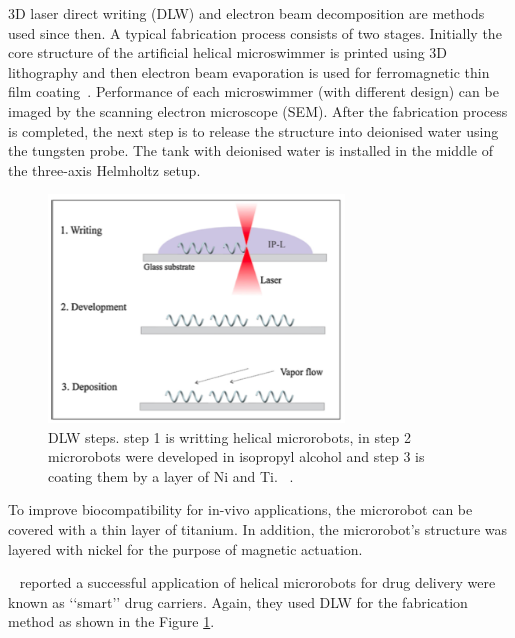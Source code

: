 \documentclass[12pt,a4paper,titlepage]{report}
\begin{document}
3D laser direct writing (DLW) and electron beam decomposition are methods used since then. A typical 
fabrication process consists of two stages. Initially the core structure of the artificial helical 
microswimmer is printed using 3D lithography and then electron beam evaporation is used for 
ferromagnetic thin film coating~\citep{tottori2013artificial}.  
Performance of each microswimmer (with different design) can be imaged by the scanning electron
 microscope (SEM). After the fabrication process is completed, the next step is to release the structure into 
deionised water using the tungsten probe. The tank with deionised water is installed in the middle of the 
three-axis Helmholtz setup. 




\begin{figure}
  \centering
    \includegraphics[width=0.7\textwidth]{tempreture}
  \caption[Direct lasor writing]{DLW steps. step 1 is writting helical microrobots, in step 2 microrobots were 
developed in isopropyl alcohol and step 3 is coating them by a layer of Ni and Ti. ~\citep{qiu2014artificial}.}
  \label{tempreture}
\end{figure}




To improve biocompatibility for in-vivo applications, the 
microrobot can be covered with a thin layer of titanium. In addition, the microrobot\rq{}s structure was layered with 
nickel for the purpose of magnetic actuation.

\citeauthor{qiu2014artificial}~\citep{qiu2014artificial} reported a successful application of helical microrobots
for drug delivery were known as \lq\lq{}smart\rq\rq{} drug carriers. Again, they used DLW for the fabrication method 
as shown in the Figure \ref{tempreture}. 
\end{document}
